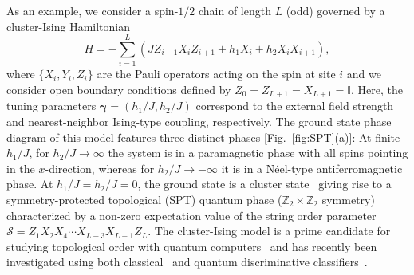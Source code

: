 \documentclass[twocolumn,aps,prl,superscriptaddress,tightlines,nofootinbib]{revtex4-2}
\begin{document}
\indent As an example, we consider a spin-$1/2$ chain of length $L$ (odd) governed by a cluster-Ising Hamiltonian~\cite{smacchia:2011,verresen:2017}
\begin{equation}\label{eq:cluster_hamiltonian}
    H = -\sum_{i=1}^{L} \left(JZ_{i-1}X_{i}Z_{i+1} + h_{1}X_{i} + h_{2} X_{i}X_{i+1} \right),
\end{equation}
where $\{X_{i}, Y_{i}, Z_{i}\}$ are the Pauli operators acting on the spin at site $i$ and we consider open boundary conditions defined by $Z_{0} = Z_{L+1}=X_{L+1} = \mathbb{I}$. Here, the tuning parameters $\bm{\gamma} = \left( h_{1}/J,h_{2}/J \right)$ correspond to the external field strength and nearest-neighbor Ising-type coupling, respectively. The ground state phase diagram of this model features three distinct phases [Fig.~\ref{fig:SPT}(a)]: At finite $h_{1}/J$, for  $h_{2}/J \rightarrow \infty$ the system is in a paramagnetic phase with all spins pointing in the $x$-direction, whereas for $h_{2}/J \rightarrow - \infty$  it is in a Néel-type antiferromagnetic phase. At $h_{1}/J = h_{2}/J = 0$, the ground state is a cluster state~\cite{briegel:2001} giving rise to a symmetry-protected topological (SPT) quantum phase ($\mathbb{Z}_{2} \times \mathbb{Z}_{2}$ symmetry) characterized by a non-zero expectation value of the string order parameter $\mathcal{S} = Z_{1}X_{2}X_{4}\cdots X_{L-3}X_{L-1}Z_{L}$. The cluster-Ising model is a prime candidate for studying topological order with quantum computers~\cite{azses:2020,herrmann:2022,smith:2022,zapletal:2023} and has recently been investigated using both classical~\cite{sadoune:2023} and quantum discriminative classifiers~\cite{herrmann:2022,zapletal:2023}.
\end{document}
